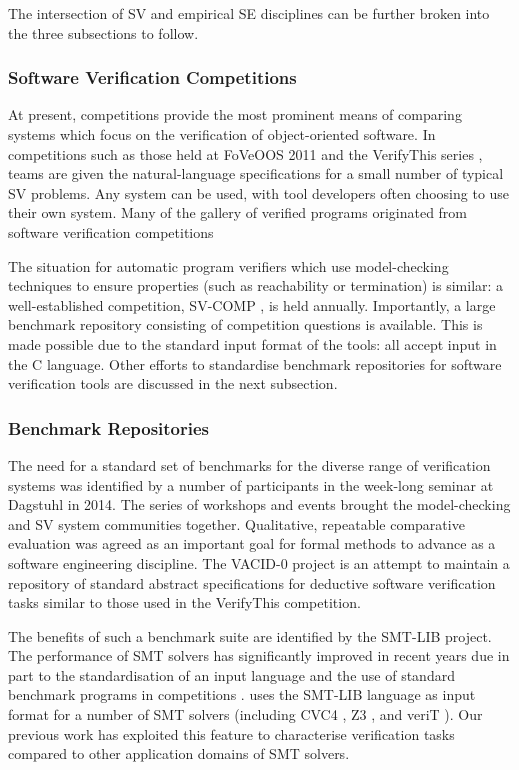 The intersection of SV and empirical SE disciplines can be further broken into the three subsections to follow.      

\subsubsection{Software Verification Competitions}
\label{sub:lrsvmmbench}

At present, competitions provide the most prominent means of comparing systems which focus on the verification of object-oriented software. In competitions such as those held at FoVeOOS 2011 \cite{bormer:hal-00789525} and the VerifyThis series \cite{Huisman2015}, teams are given the natural-language specifications for a small number of typical SV problems. Any system can be used, with tool developers often choosing to use their own system. Many of the \why gallery of verified programs originated from software verification competitions \cite{verifythis} 

The situation for automatic program verifiers which use model-checking techniques to ensure properties (such as reachability or termination) is similar: a well-established competition, SV-COMP \cite{SVCOMP}, is held annually. Importantly, a large benchmark repository consisting of competition questions is available. This is made possible due to the standard input format of the tools: all accept input in the C language. Other efforts to standardise benchmark repositories for software verification tools are discussed in the next subsection.  

\subsubsection{Benchmark Repositories}

The need for a standard set of benchmarks for the diverse range of verification systems was identified by a number of participants in the week-long seminar at Dagstuhl \cite{Dagstuhl} in 2014. The series of workshops and events brought the model-checking and SV system communities together. Qualitative, repeatable comparative evaluation was agreed as an important goal for formal methods to advance as a software engineering discipline. The VACID-0 \cite{Leino10vacid-0:verification} project is an attempt to maintain a repository of standard abstract specifications for deductive software verification tasks similar to those used in the VerifyThis competition.  

The benefits of such a benchmark suite are identified by the SMT-LIB \cite{SMTLIB} project. The performance of SMT solvers has significantly improved in recent years due in part to the standardisation of an input language and the use of standard benchmark programs in competitions \cite{SMTEVAL2013}. \why uses the SMT-LIB language as input format for a number of SMT solvers (including CVC4 \cite{CVC4}, Z3 \cite{Z3}, and veriT \cite{veriT}). Our previous work \cite{Healy:2016} has exploited this feature to characterise verification tasks  compared to other application domains of SMT solvers.

